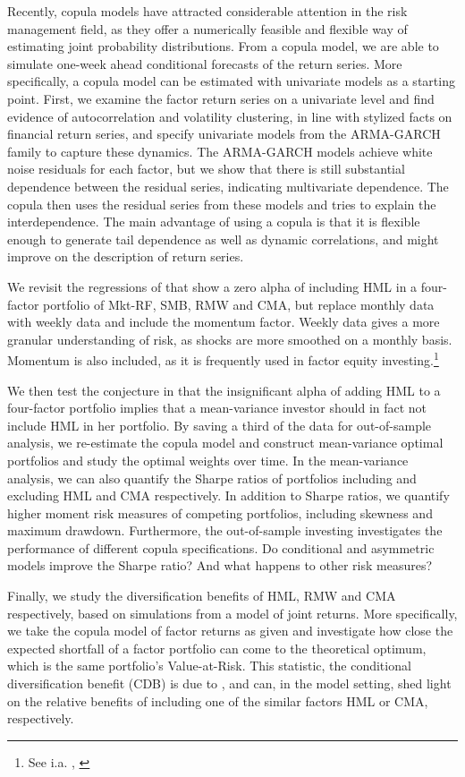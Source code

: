 Recently, copula models have attracted considerable attention in the risk management field, as they offer a numerically feasible and flexible way of estimating joint probability distributions. From a copula model, we are able to simulate one-week ahead conditional forecasts of the return series. More specifically, a copula model can be estimated with univariate models as a starting point. First, we examine the factor return series on a univariate level and find evidence of autocorrelation and volatility clustering, in line with stylized facts on financial return series, and specify univariate models from the ARMA-GARCH family to capture these dynamics. The ARMA-GARCH models achieve white noise residuals for each factor, but we show that there is still substantial dependence between the residual series, indicating multivariate dependence. The copula then uses the residual series from these models and tries to explain the interdependence. The main advantage of using a copula is that it is flexible enough to generate tail dependence as well as dynamic correlations, and might improve on the description of return series.

We revisit the regressions of \textcite{FF2015} that show a zero alpha of including HML in a four-factor portfolio of Mkt-RF, SMB, RMW and CMA, but replace monthly data with weekly data and include the momentum factor. Weekly data gives a more granular understanding of risk, as shocks are more smoothed on a monthly basis. Momentum is also included, as it is frequently used in factor equity investing.\footnote{See i.a. \textcite{Pedersen2015}, \textcite{Ilmanen2011}} 

We then test the conjecture in \textcite{FF2015} that the insignificant alpha of adding HML to a four-factor portfolio implies that a mean-variance investor should in fact not include HML in her portfolio. By saving a third of the data for out-of-sample analysis, we re-estimate the copula model and construct mean-variance optimal portfolios and study the optimal weights over time. In the mean-variance analysis, we can also quantify the Sharpe ratios of portfolios including and excluding HML and CMA respectively. In addition to Sharpe ratios, we quantify higher moment risk measures of competing portfolios, including skewness and maximum drawdown. Furthermore, the out-of-sample investing investigates the performance of different copula specifications. Do conditional and asymmetric models improve the Sharpe ratio? And what happens to other risk measures?

Finally, we study the diversification benefits of HML, RMW and CMA respectively, based on simulations from a model of joint returns. More specifically, we take the copula model of factor returns as given and investigate how close the expected shortfall of a factor portfolio can come to the theoretical optimum, which is the same portfolio's Value-at-Risk. This statistic, the conditional diversification benefit (CDB) is due to \textcite{ChristoffersenErrunzaJacobLanglois2012}, and can, in the model setting, shed light on the relative benefits of including one of the similar factors HML or CMA, respectively.

